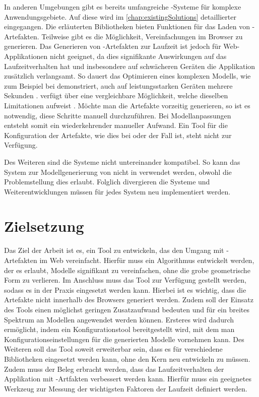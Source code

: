 In anderen Umgebungen gibt es bereits umfangreiche -Systeme für komplexe Anwendungsgebiete. Auf diese wird im \autoref{chap:existingSolutions} detaillierter eingegangen.
Die erläuterten Bibliotheken bieten Funktionen für das Laden von -Artefakten. Teilweise gibt es die Möglichkeit, Vereinfachungen im Browser zu generieren. Das Generieren von -Artefakten zur Laufzeit ist jedoch für Web-Applikationen nicht geeignet, da dies signifikante Auswirkungen auf das Laufzeitverhalten hat und insbesondere auf schwächeren Geräten die Applikation zusätzlich verlangsamt.
So dauert das Optimieren eines komplexen Modells, wie zum Beispiel bei  demonstriert, auch auf leistungsstarken Geräten mehrere Sekunden \cite{babylonAutoLod}.  verfügt über eine vergleichbare Möglichkeit, welche dieselben Limitationen aufweist \cite{threeSimplifyModifier}. Möchte man die Artefakte vorzeitig generieren, so ist es notwendig, diese Schritte manuell durchzuführen. Bei Modellanpassungen entsteht somit ein wiederkehrender manueller Aufwand. Ein Tool für die Konfiguration der Artefakte, wie dies bei  oder  der Fall ist, steht nicht zur Verfügung.

Des Weiteren sind die Systeme nicht untereinander kompatibel. So kann das System zur Modellgenerierung von  nicht in  verwendet werden, obwohl die Problemstellung dies erlaubt. Folglich divergieren die Systeme und Weiterentwicklungen müssen für jedes System neu implementiert werden.

\pagebreak

\section{Zielsetzung}
Das Ziel der Arbeit ist es, ein Tool zu entwickeln, das den Umgang mit -Artefakten im Web vereinfacht. Hierfür muss ein Algorithmus entwickelt werden, der es erlaubt, Modelle signifikant zu vereinfachen, ohne die grobe geometrische Form zu verlieren. Im Anschluss muss das Tool zur Verfügung gestellt werden, sodass es in der Praxis eingesetzt werden kann. Hierbei ist es wichtig, dass die Artefakte nicht innerhalb des Browsers generiert werden. Zudem soll der Einsatz des Tools einen möglichst geringen Zusatzaufwand bedeuten und für ein breites Spektrum an Modellen angewendet werden können. Ersteres wird dadurch ermöglicht, indem ein Konfigurationstool bereitgestellt wird, mit dem man Konfigurationseinstellungen für die generierten Modelle vornehmen kann. Des Weiteren soll das Tool soweit erweiterbar sein, dass es für verschiedene Bibliotheken eingesetzt werden kann, ohne den Kern neu entwickeln zu müssen. Zudem muss der Beleg erbracht werden, dass das Laufzeitverhalten der Applikation mit -Artfakten verbessert werden kann. Hierfür muss ein geeignetes Werkzeug zur Messung der wichtigsten Faktoren der Laufzeit definiert werden.

